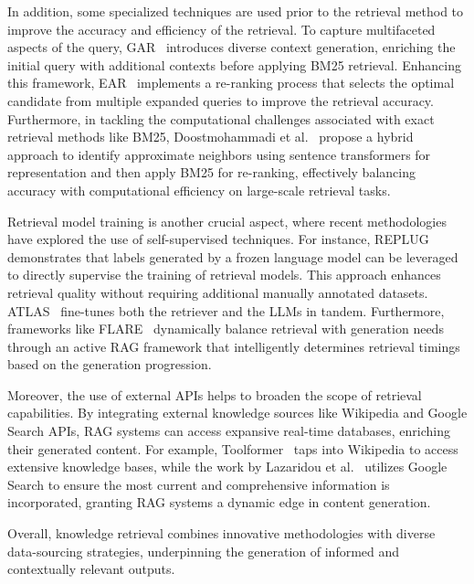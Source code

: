 \documentclass[lettersize,journal]{IEEEtran}
\begin{document}
In addition, some specialized techniques are used prior to the retrieval method to improve the accuracy and efficiency of the retrieval. To capture multifaceted aspects of the query, GAR~\cite{mao2020generation} introduces diverse context generation, enriching the initial query with additional contexts before applying BM25 retrieval. Enhancing this framework, EAR~\cite{chuang2023expand} implements a re-ranking process that selects the optimal candidate from multiple expanded queries to improve the retrieval accuracy. Furthermore, in tackling the computational challenges associated with exact retrieval methods like BM25, Doostmohammadi et al.~\cite{doostmohammadi2023surface} propose a hybrid approach to identify approximate neighbors using sentence transformers for representation and then apply BM25 for re-ranking, effectively balancing accuracy with computational efficiency on large-scale retrieval tasks.

Retrieval model training is another crucial aspect, where recent methodologies have explored the use of self-supervised techniques. For instance, REPLUG~\cite{shi2023replug} demonstrates that labels generated by a frozen language model can be leveraged to directly supervise the training of retrieval models. This approach enhances retrieval quality without requiring additional manually annotated datasets. ATLAS~\cite{izacard2023atlas} fine-tunes both the retriever and the LLMs in tandem. Furthermore, frameworks like FLARE~\cite{jiang2023active} dynamically balance retrieval with generation needs through an active RAG framework that intelligently determines retrieval timings based on the generation progression.

Moreover, the use of external APIs helps to broaden the scope of retrieval capabilities. By integrating external knowledge sources like Wikipedia and Google Search APIs, RAG systems can access expansive real-time databases, enriching their generated content. For example, Toolformer~\cite{schick2024toolformer} taps into Wikipedia to access extensive knowledge bases, while the work by Lazaridou et al.~\cite{lazaridou2022internet} utilizes Google Search to ensure the most current and comprehensive information is incorporated, granting RAG systems a dynamic edge in content generation.

Overall, knowledge retrieval combines innovative methodologies with diverse data-sourcing strategies, underpinning the generation of informed and contextually relevant outputs.
\end{document}
